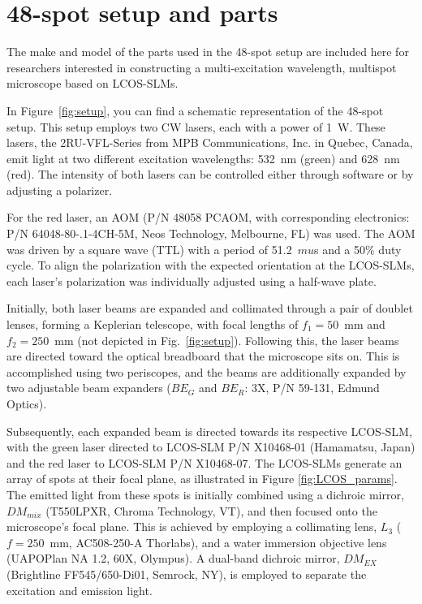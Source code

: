 \chapter{48-spot setup and parts}
\label{chpt:setup_appendix}

The make and model of the parts used in the 48-spot setup are included here for researchers interested in constructing a multi-excitation wavelength, multispot microscope based on \ac{LCOS-SLM}s. 

In Figure~\ref{fig:setup}, you can find a schematic representation of the 48-spot setup. 
This setup employs two \ac{CW} lasers, each with a power of 1~W. 
These lasers, the 2RU-VFL-Series from MPB Communications, Inc. in Quebec, Canada, emit light at two different excitation wavelengths: 532~nm (green) and 628~nm (red). 
The intensity of both lasers can be controlled either through software or by adjusting a polarizer.

For the red laser, an \ac{AOM} (P/N 48058 PCAOM, with corresponding electronics: P/N 64048-80-.1-4CH-5M, Neos Technology, Melbourne, FL) was used. 
The \ac{AOM} was driven by a square wave (\ac{TTL}) with a period of 51.2~$mu$s and a 50\% duty cycle. 
To align the polarization with the expected orientation at the \ac{LCOS-SLM}s, each laser's polarization was individually adjusted using a half-wave plate.

Initially, both laser beams are expanded and collimated through a pair of doublet lenses, forming a Keplerian telescope, with focal lengths of $f_1 = 50$~mm and $f_2 = 250$~mm (not depicted in Fig.~\ref{fig:setup}). 
Following this, the laser beams are directed toward the optical breadboard that the microscope sits on. 
This is accomplished using two periscopes, and the beams are additionally expanded by two adjustable beam expanders ($BE_{G}$ and $BE_{R}$: 3X, P/N 59-131, Edmund Optics).

Subsequently, each expanded beam is directed towards its respective \ac{LCOS-SLM}, with the green laser directed to \ac{LCOS-SLM} P/N X10468-01 (Hamamatsu, Japan) and the red laser to \ac{LCOS-SLM} P/N X10468-07. 
The \ac{LCOS-SLM}s generate an array of spots at their focal plane, as illustrated in Figure \ref{fig:LCOS_params}. 
The emitted light from these spots is initially combined using a dichroic mirror, $DM_{mix}$ (T550LPXR, Chroma Technology, VT), and then focused onto the microscope's focal plane. 
This is achieved by employing a collimating lens, $L_3$ ($f = 250$~mm, AC508-250-A Thorlabs), and a water immersion objective lens (UAPOPlan NA 1.2, 60X, Olympus). 
A dual-band dichroic mirror, $DM_{EX}$ (Brightline FF545/650-Di01, Semrock, NY), is employed to separate the excitation and emission light.

